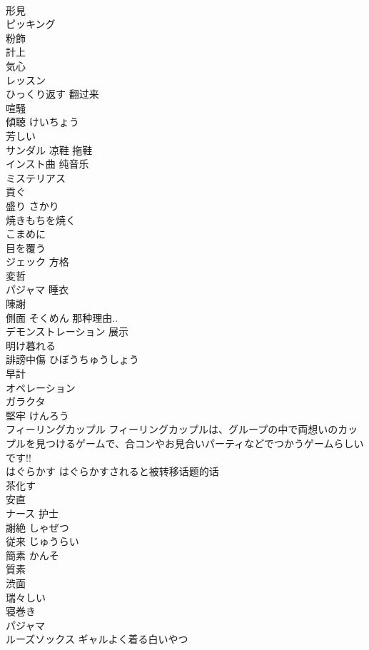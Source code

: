 \documentclass[8pt]{extreport}
\begin{document}
\begin{CJK}{UTF8}{min}
\\	形見	
\\	ピッキング	
\\	粉飾	
\\	計上	
\\	気心	
\\	レッスン	
\\	ひっくり返す	翻过来
\\	喧騒	
\\	傾聴	けいちょう
\\	芳しい	
\\	サンダル	凉鞋 拖鞋
\\	インスト曲	纯音乐
\\	ミステリアス	
\\	貢ぐ	
\\	盛り	さかり
\\	焼きもちを焼く	
\\	こまめに	
\\	目を覆う	
\\	ジェック	方格
\\	変哲	
\\	パジャマ	睡衣
\\	陳謝	
\\	側面	そくめん 那种理由..
\\	デモンストレーション	展示
\\	明け暮れる	
\\	誹謗中傷	ひぼうちゅうしょう
\\	早計	
\\	オペレーション	
\\	ガラクタ	
\\	堅牢	けんろう
\\	フィーリングカップル	フィーリングカップルは、グループの中で両想いのカップルを見つけるゲームで、合コンやお見合いパーティなどでつかうゲームらしいです!!
\\	はぐらかす	はぐらかすされると被转移话题的话
\\	茶化す	
\\	安直	
\\	ナース	护士
\\	謝絶	しゃぜつ
\\	従来	じゅうらい
\\	簡素	かんそ
\\	質素	
\\	渋面	
\\	瑞々しい	
\\	寝巻き	
\\	パジャマ	
\\	ルーズソックス	ギャルよく着る白いやつ

\end{CJK}
\end{document}
